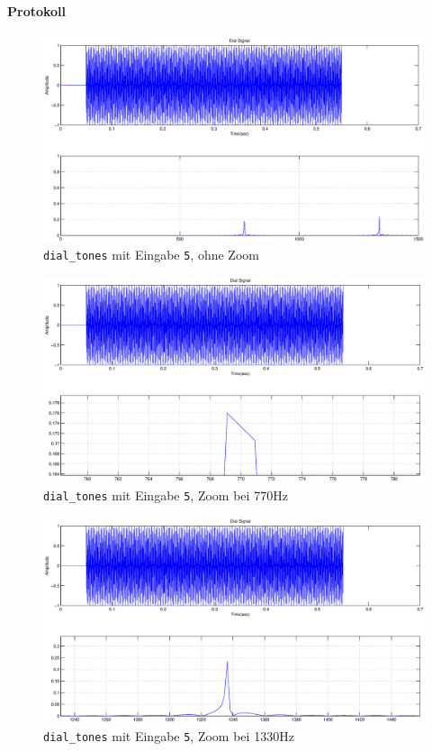\documentclass[10pt]{scrreprt}
\begin{document}
        \paragraph{Protokoll}

        \begin{center}
            \begin{figure}[H]
                \includegraphics[width=\textwidth]{img43421}
                \caption{\texttt{dial\_tones} mit Eingabe \texttt{5}, ohne Zoom}
            \end{figure}
            \begin{figure}[H]
                \includegraphics[width=\textwidth]{img43421detail}
                \caption{\texttt{dial\_tones} mit Eingabe \texttt{5}, Zoom bei 770Hz}
            \end{figure}
            \begin{figure}[H]
                \includegraphics[width=\textwidth]{img43421detail2}
                \caption{\texttt{dial\_tones} mit Eingabe \texttt{5}, Zoom bei 1330Hz}
            \end{figure}
        \end{center}
\end{document}
